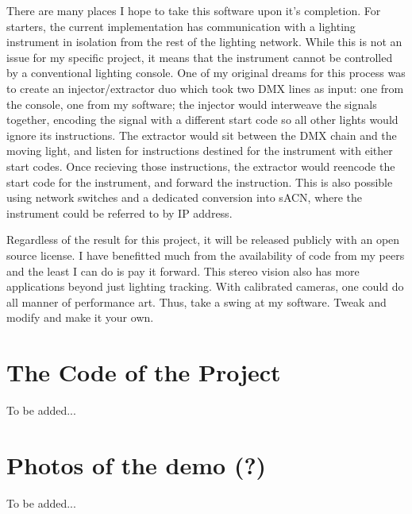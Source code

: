 \documentclass[12pt,twoside]{reedthesis}
\begin{document}
There are many places I hope to take this software upon it's completion. For starters, the current implementation has communication with a lighting instrument in isolation from the rest of the lighting network. While this is not an issue for my specific project, it means that the instrument cannot be controlled by a conventional lighting console. One of my original dreams for this process was to create an injector/extractor duo which took two DMX lines as input: one from the console, one from my software; the injector would interweave the signals together, encoding the signal with a different start code so all other lights would ignore its instructions. The extractor would sit between the DMX chain and the moving light, and listen for instructions destined for the instrument with either start codes. Once recieving those instructions, the extractor would reencode the start code for the instrument, and forward the instruction. This is also possible using network switches and a dedicated conversion into sACN, where the instrument could be referred to by IP address.

Regardless of the result for this project, it will be released publicly with an open source license. I have benefitted much from the availability of code from my peers and the least I can do is pay it forward. This stereo vision also has more applications beyond just lighting tracking. With calibrated cameras, one could do all manner of performance art. Thus, take a swing at my software. Tweak and modify and make it your own.

    \appendix
      \chapter{The Code of the Project}
      To be added...
      \chapter{Photos of the demo (?)}
      To be added...



  \backmatter %

    \nocite{*}


%  
 

\end{document}
